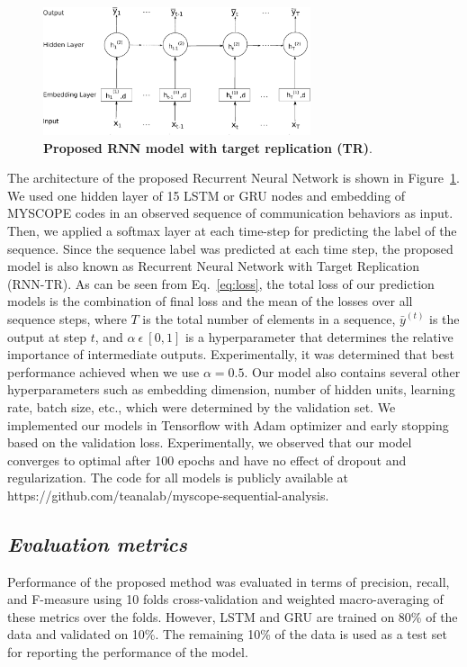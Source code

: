 \documentclass{amia_summit_2018}
\begin{document}
\begin{figure}[!htb]
    \centering
    \includegraphics[width=0.70\textwidth]{figures/rnn_small.eps}
    \caption{\textbf{Proposed RNN model with target replication (TR)}.}
    \label{fig:rnn-model}
\end{figure}
The architecture of the proposed Recurrent Neural Network is shown in Figure~\ref{fig:rnn-model}. We used one hidden layer of 15 LSTM or GRU nodes and embedding of MYSCOPE codes in an observed
sequence of communication behaviors as input. Then, we applied a softmax layer at each time-step for predicting the label of the sequence. Since the sequence label was predicted at each time step, the proposed model is also known as Recurrent Neural Network with Target Replication (RNN-TR). As can be seen from
Eq.~\ref{eq:loss}, the total loss of our prediction models is the combination of final loss and the mean of the losses over all sequence steps, where $T$ is the total number of elements in a sequence,
$\bar y^{(t)}$ is the output at step $t$, and $\alpha\ \epsilon\ [0, 1]$ is a hyperparameter that determines the relative importance of intermediate outputs. Experimentally, it was determined that
best performance achieved when we use $\alpha=0.5$. Our model also contains several other hyperparameters such as embedding dimension, number of hidden units, learning rate, batch size, etc., which
were determined by the validation set. We implemented our models in Tensorflow with Adam optimizer and early stopping based on the validation loss. Experimentally, we observed that our model converges
to optimal after 100 epochs and have no effect of dropout and regularization. The code for all models is publicly available at https://github.com/teanalab/myscope-sequential-analysis.   
  
\subsection*{\textit{Evaluation metrics}}
Performance of the proposed method was evaluated in terms of precision, recall, and F-measure using 10 folds cross-validation and weighted macro-averaging of these metrics over the folds. However, LSTM and GRU are trained on 80\% of the data and validated on 10\%. The remaining 10\% of the data is used as a test set for reporting the performance of the model. 
\end{document}
